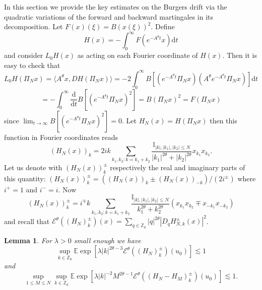 \documentclass[11pt,a4paper,draft,reqno]{amsart}
\newtheorem{lemma}{Lemma}
\newcommand{\II}{\mathbb{I}}
\newcommand{\ZZ}{\mathbb{Z}}
\newcommand{\expect}{\mathbb{E}}
\newcommand{\cE}{\mathcal{E}}
\newcommand{\dd}{\mathrm{d}}
\begin{document}
In this section we provide the key estimates on the Burgers drift via the quadratic variations of the forward and backward martingales in its decomposition.
Let $F(x)(\xi) = B (x(\xi))^2$. Define 
$$
H(x) = -\int_0^\infty F(e^{-A^\theta t}x)\dd t
$$
and consider $L_0 H(x)$ as acting on each Fourier coordinate of $H(x)$. Then it is easy to check that 
$$
L_0 H(\Pi_N x) = \langle A^\theta x, D H(\Pi_N x)\rangle  = -2 \int_0^\infty B [(e^{-A^\theta t}\Pi_N x)(A^\theta e^{-A^\theta t} \Pi_N x) ]\dd t
$$
$$
=  -\int_0^\infty \frac{\dd }{\dd t}B [(e^{-A^\theta t}\Pi_N x)^2 ] = B (\Pi_N x)^2=F(\Pi_N x)
$$
since $\lim_{t\to \infty} B [(e^{-A^\theta t}\Pi_N x)^2 ]  = 0$. Let $H_N(x)= H(\Pi_N x)$ then this function in Fourier coordinates reads
$$
(H_{N}(x))_k =
2 ik  \sum_{k_1,k_2 : k=k_1+k_2}  \frac{\II_{|k|,|k_1|,|k_2|\le N}}{|k_1|^{2\theta}+|k_2|^{2\theta}} x_{k_1} x_{k_2}.
$$
Let us denote with $(H_{N}(x))_k^{\pm}$ respectively the real and imaginary parts of this quantity: $(H_{N}(x))_k^{\pm}= ((H_{N}(x))_k\pm (H_{N}(x))_{-k})/(2 i^{\pm})$ where $i^+=1$ and $i^-=i$. Now
$$
(H_{N}(x))^\pm_k =
 i^{\mp}k  \sum_{k_1,k_2 : k=k_1+k_2}  \frac{\II_{|k|,|k_1|,|k_2|\le N}}{k_1^{2\theta}+k_2^{2\theta}} (x_{k_1} x_{k_2}\mp x_{-k_1} x_{-k_2})
$$
and recall that
$
\cE^\theta((H_N)^\pm_k)(x) = \sum_{q\in\ZZ_0} |q|^{2\theta} |D_q H^\pm_{N,k}(x)|^2
$.
\begin{lemma}
\label{lemma:energy-estimates}
For $\lambda >0$ small enough we have
\begin{equation}
\sup_{k\in\ZZ_0} \expect \exp\left[\lambda |k|^{2\theta-3}  \cE^\theta((H_N)^\pm_k)(u_0)\right] \lesssim 1
\end{equation}
and
\begin{equation}
\sup_{1\le M \le N}\sup_{k\in\ZZ_0} \expect \exp\left[\lambda |k|^{-2} M^{2\theta-1}  \cE^\theta((H_N-H_M)^\pm_k)(u_0)\right] \lesssim 1.
\end{equation}
\end{lemma}
\end{document}
